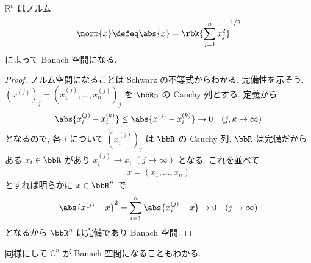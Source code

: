 \documentclass[openany, a4paper, oneside]{jsbook}
\begin{document}
\begin{ex}
$\mathbb{R}^n$ はノルム
\begin{align}
 \norm{x}
 \defeq
 \abs{x}
 =
 \rbk{\sum_{j=1}^n x_j^2}^{1/2}
\end{align}
によって Banach 空間になる.

\begin{proof}
ノルム空間になることは Schwarz の不等式からわかる.
完備性を示そう.
$(x^{(j)})_j = (x_1^{(j)}, \dots, x_n^{(j)})_j$ を $\bbRn$ の Cauchy 列とする.
定義から
\begin{align}
 \abs{x_i^{(j)} - x_i^{(k)}}
 \leq
 \abs{x^{(j)} - x_i^{(k)}} \to 0 \quad (j, k \to \infty)
\end{align}
となるので, 各 $i$ について $(x_i^{(j)})_j$ は $\bbR$ の Cauchy 列.
$\bbR$ は完備だからある $x_i \in \bbR$ があり $x_i^{(j)} \to x_i$ $(j \to \infty)$ となる.
これを並べて
\begin{align}
 x
 =
 (x_1, \dots, x_n)
\end{align}
とすれば明らかに $x \in \bbR^n$ で
\begin{align}
 \abs{x^{(j)} - x}^2
 =
 \sum_{i=1}^n \abs{x_i^{(j)} - x} \to 0 \quad (j \to \infty)
\end{align}
となるから $\bbR^n$ は完備であり Banach 空間.
\end{proof}

同様にして $\mathbb{C}^n$ が Banach 空間になることもわかる.
\end{ex}
\end{document}
